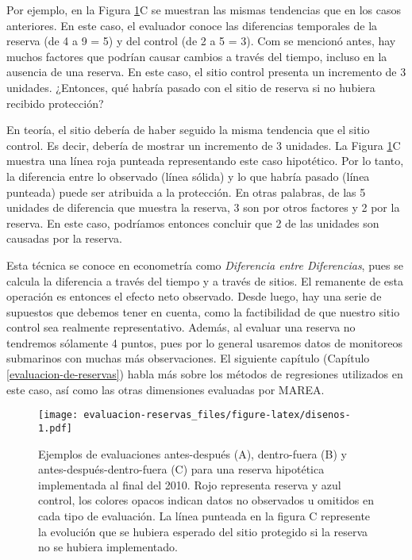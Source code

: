 \documentclass[]{krantz}
\begin{document}
Por ejemplo, en la Figura \ref{fig:disenos}C se muestran las mismas
tendencias que en los casos anteriores. En este caso, el evaluador
conoce las diferencias temporales de la reserva (de 4 a 9 = 5) y del
control (de 2 a 5 = 3). Com se mencionó antes, hay muchos factores que
podrían causar cambios a través del tiempo, incluso en la ausencia de
una reserva. En este caso, el sitio control presenta un incremento de 3
unidades. ¿Entonces, qué habría pasado con el sitio de reserva si no
hubiera recibido protección?

En teoría, el sitio debería de haber seguido la misma tendencia que el
sitio control. Es decir, debería de mostrar un incremento de 3 unidades.
La Figura \ref{fig:disenos}C muestra una línea roja punteada
representando este caso hipotético. Por lo tanto, la diferencia entre lo
observado (línea sólida) y lo que habría pasado (línea punteada) puede
ser atribuida a la protección. En otras palabras, de las 5 unidades de
diferencia que muestra la reserva, 3 son por otros factores y 2 por la
reserva. En este caso, podríamos entonces concluir que 2 de las unidades
son causadas por la reserva.

Esta técnica se conoce en econometría como \emph{Diferencia entre
Diferencias}, pues se calcula la diferencia a través del tiempo y a
través de sitios. El remanente de esta operación es entonces el efecto
neto observado. Desde luego, hay una serie de supuestos que debemos
tener en cuenta, como la factibilidad de que nuestro sitio control sea
realmente representativo. Además, al evaluar una reserva no tendremos
sólamente 4 puntos, pues por lo general usaremos datos de monitoreos
submarinos con muchas más observaciones. El siguiente capítulo (Capítulo
\ref{evaluacion-de-reservas}) habla más sobre los métodos de regresiones
utilizados en este caso, así como las otras dimensiones evaluadas por
MAREA.

\begin{figure}
\centering
\texttt{[image: evaluacion-reservas\_files/figure-latex/disenos-1.pdf]}
\caption{\label{fig:disenos}Ejemplos de evaluaciones antes-después (A),
dentro-fuera (B) y antes-después-dentro-fuera (C) para una reserva
hipotética implementada al final del 2010. Rojo representa reserva y
azul control, los colores opacos indican datos no observados u omitidos
en cada tipo de evaluación. La línea punteada en la figura C represente
la evolución que se hubiera esperado del sitio protegido si la reserva
no se hubiera implementado.}
\end{figure}
\end{document}
